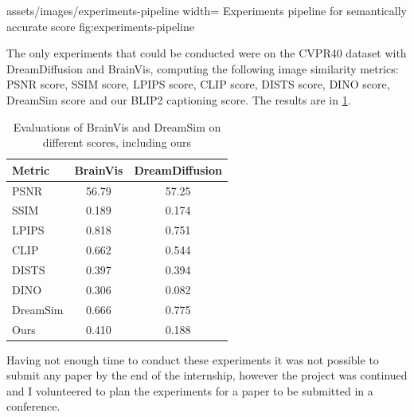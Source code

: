 \insertfigure
    {assets/images/experiments-pipeline}
    {width=\textwidth}
    {Experiments pipeline for semantically accurate score}
    {fig:experiments-pipeline}

The only experiments that could be conducted were on the CVPR40 dataset with
DreamDiffusion and BrainVis, computing the following image similarity metrics:
PSNR\cite{psnr} score, SSIM\cite{ssim} score, LPIPS\cite{lpips} score,
CLIP\cite{clip} score, DISTS\cite{dists} score, DINO\cite{dino} score,
DreamSim\cite{dreamsim} score and our BLIP2 captioning score. The results are in
\cref{table:exps-results}.

\begin{table}[h!]
    \centering
    \label{table:exps-results}
    \caption{Evaluations of BrainVis and DreamSim on different scores, including
    ours}
    \begin{tabular}{lcc}
    \hline
    \textbf{Metric} & \textbf{BrainVis} & \textbf{DreamDiffusion} \\
    \hline
    PSNR & 56.79 & 57.25 \\
    SSIM  & 0.189 & 0.174 \\
    LPIPS & 0.818 & 0.751 \\
    CLIP  & 0.662 & 0.544 \\
    DISTS & 0.397 & 0.394 \\
    DINO  & 0.306 & 0.082 \\
    DreamSim & 0.666 & 0.775 \\
    Ours & 0.410 & 0.188 \\
    \hline
    \end{tabular}
\end{table}

Having not enough time to conduct these experiments it was not possible to
submit any paper by the end of the internship, however the project was continued
and I volunteered to plan the experiments for a paper to be submitted in a
conference.